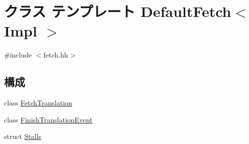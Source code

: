 \hypertarget{classDefaultFetch}{
\section{クラス テンプレート DefaultFetch$<$ Impl $>$}
\label{classDefaultFetch}
}


{\ttfamily \#include $<$fetch.hh$>$}\subsection*{構成}
\begin{DoxyCompactItemize}
\item 
class \hyperlink{classDefaultFetch_1_1FetchTranslation}{FetchTranslation}
\item 
class \hyperlink{classDefaultFetch_1_1FinishTranslationEvent}{FinishTranslationEvent}
\item 
struct \hyperlink{structDefaultFetch_1_1Stalls}{Stalls}
\end{DoxyCompactItemize}
